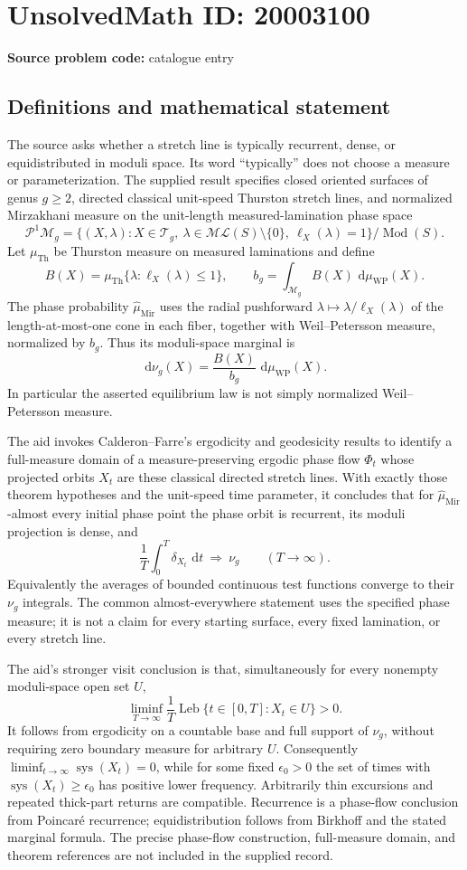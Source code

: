 \documentclass[11pt]{article}
\newcommand{\dd}{\,\mathrm{d}}
\begin{document}
\section*{UnsolvedMath ID: 20003100}
\textbf{Source problem code:} catalogue entry
\subsection{Definitions and mathematical statement}
The source asks whether a stretch line is typically recurrent, dense, or equidistributed in moduli space. Its word ``typically'' does not choose a measure or parameterization. The supplied result specifies closed oriented surfaces of genus $g\geq2$, directed classical unit-speed Thurston stretch lines, and normalized Mirzakhani measure on the unit-length measured-lamination phase space
\[
\mathcal P^1\mathcal M_g=\{(X,\lambda):X\in\mathcal T_g,\ \lambda\in\mathcal{ML}(S)\setminus\{0\},\ \ell_X(\lambda)=1\}/\operatorname{Mod}(S).
\]
Let $\mu_{\mathrm{Th}}$ be Thurston measure on measured laminations and define
\[
B(X)=\mu_{\mathrm{Th}}\{\lambda:\ell_X(\lambda)\leq1\},\qquad
b_g=\int_{\mathcal M_g}B(X)\,\dd\mu_{\mathrm{WP}}(X).
\]
The phase probability $\widehat\mu_{\mathrm{Mir}}$ uses the radial pushforward $\lambda\mapsto\lambda/\ell_X(\lambda)$ of the length-at-most-one cone in each fiber, together with Weil--Petersson measure, normalized by $b_g$. Thus its moduli-space marginal is
\[
\dd\nu_g(X)=\frac{B(X)}{b_g}\,\dd\mu_{\mathrm{WP}}(X).
\]
In particular the asserted equilibrium law is not simply normalized Weil--Petersson measure.

The aid invokes Calderon--Farre's ergodicity and geodesicity results to identify a full-measure domain of a measure-preserving ergodic phase flow $\Phi_t$ whose projected orbits $X_t$ are these classical directed stretch lines. With exactly those theorem hypotheses and the unit-speed time parameter, it concludes that for $\widehat\mu_{\mathrm{Mir}}$-almost every initial phase point the phase orbit is recurrent, its moduli projection is dense, and
\[
\frac1T\int_0^T\delta_{X_t}\,\dd t\ \Longrightarrow\ \nu_g\qquad(T\to\infty).
\]
Equivalently the averages of bounded continuous test functions converge to their $\nu_g$ integrals. The common almost-everywhere statement uses the specified phase measure; it is not a claim for every starting surface, every fixed lamination, or every stretch line.

The aid's stronger visit conclusion is that, simultaneously for every nonempty moduli-space open set $U$,
\[
\liminf_{T\to\infty}\frac1T\operatorname{Leb}\{t\in[0,T]:X_t\in U\}>0.
\]
It follows from ergodicity on a countable base and full support of $\nu_g$, without requiring zero boundary measure for arbitrary $U$. Consequently $\liminf_{t\to\infty}\operatorname{sys}(X_t)=0$, while for some fixed $\epsilon_0>0$ the set of times with $\operatorname{sys}(X_t)\geq\epsilon_0$ has positive lower frequency. Arbitrarily thin excursions and repeated thick-part returns are compatible. Recurrence is a phase-flow conclusion from Poincar\'e recurrence; equidistribution follows from Birkhoff and the stated marginal formula. The precise phase-flow construction, full-measure domain, and theorem references are not included in the supplied record.
\end{document}
